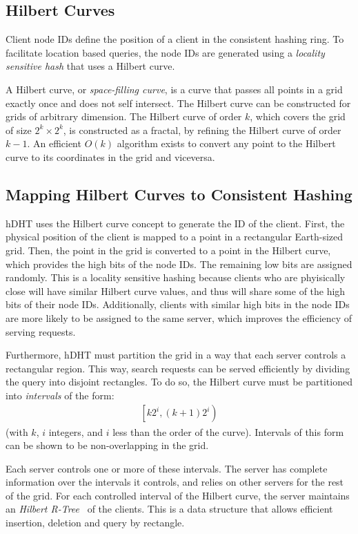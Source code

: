 \subsection{Hilbert Curves}

Client node IDs define the position of a client in the consistent hashing ring.
To facilitate location based queries, the node IDs are generated using a \textit{locality sensitive hash} that uses a Hilbert curve.

A Hilbert curve, or \textit{space-filling curve}, is a curve that passes all points in a grid exactly once and does not self intersect.
The Hilbert curve can be constructed for grids of arbitrary dimension.
The Hilbert curve of order $k$, which covers the grid of size $2^k \times 2^k$, is constructed as a fractal, by refining the Hilbert curve of order $k-1$.
An efficient $O(k)$ algorithm exists to convert any point to the Hilbert curve to its coordinates in the grid and viceversa.

\subsection{Mapping Hilbert Curves to Consistent Hashing}

hDHT uses the Hilbert curve concept to generate the ID of the client.
First, the physical position of the client is mapped to a point in a rectangular Earth-sized grid.
Then, the point in the grid is converted to a point in the Hilbert curve, which provides the high bits of the node IDs.
The remaining low bits are assigned randomly.
This is a locality sensitive hashing because clients who are phyisically close will have similar Hilbert curve values, and thus will share some of the high bits of their node IDs.
Additionally, clients with similar high bits in the node IDs are more likely to be assigned to the same server, which improves the efficiency of serving requests.

Furthermore, hDHT must partition the grid in a way that each server controls a rectangular region.
This way, search requests can be served efficiently by dividing the query into disjoint rectangles.
To do so, the Hilbert curve must be partitioned into \textit{intervals} of the form:
\begin{align}
\left[k 2^i, (k+1) 2^i\right)
\end{align}
(with $k$, $i$ integers, and $i$ less than the order of the curve).
Intervals of this form can be shown to be non-overlapping in the grid.

Each server controls one or more of these intervals.
The server has complete information over the intervals it controls, and relies on other servers for the rest of the grid.
For each controlled interval of the Hilbert curve, the server maintains an \textit{Hilbert R-Tree}~\cite{kamel1993hilbert} of the clients.
This is a data structure that allows efficient insertion, deletion and query by rectangle.

